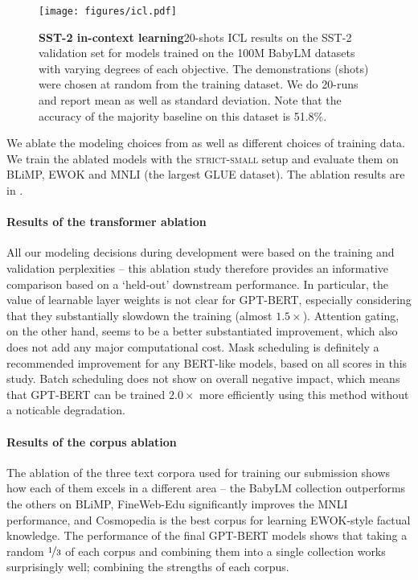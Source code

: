 \begin{figure*}[!th]
    \centering
    \texttt{[image: figures/icl.pdf]}

    \caption{\textbf{SST-2 in-context learning}\hspace{1.5em}20-shots ICL results on the SST-2 validation set for models trained on the 100M BabyLM datasets with varying degrees of each objective. The demonstrations (shots) were chosen at random from the training dataset. We do 20-runs and report mean as well as standard deviation. Note that the accuracy of the majority baseline on this dataset is 51.8\%.}
    \label{tab:icl_sst2_varying}
\end{figure*}

We ablate the modeling choices from  as well as different choices of training data. We train the ablated models with the \textsc{strict-small} setup and evaluate them on BLiMP, EWOK and MNLI (the largest GLUE dataset). The ablation results are in .

\paragraph{Results of the transformer ablation} All our modeling decisions during development were based on the training and validation perplexities -- this ablation study therefore provides an informative comparison based on a `held-out' downstream performance.  In particular, the value of learnable layer weights is not clear for GPT-BERT, especially considering that they substantially slowdown the training (almost $1.5\times$).  Attention gating, on the other hand, seems to be a better substantiated improvement, which also does not add any major computational cost.  Mask scheduling is definitely a recommended improvement for any BERT-like models, based on all scores in this study.  Batch scheduling does not show on overall negative impact, which means that GPT-BERT can be trained $2.0\times$ more efficiently using this method without a noticable degradation.

\paragraph{Results of the corpus ablation} The ablation of the three text corpora used for training our submission shows how each of them excels in a different area -- the BabyLM collection outperforms the others on BLiMP, FineWeb-Edu significantly improves the MNLI performance, and Cosmopedia is the best corpus for learning EWOK-style factual knowledge. The performance of the final GPT-BERT models shows that taking a random $\nicefrac{1}{3}$ of each corpus and combining them into a single collection works surprisingly well; combining the strengths of each corpus.

